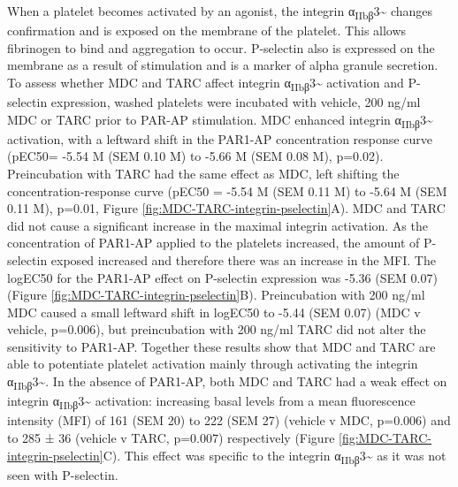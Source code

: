 \documentclass[11pt,twoside]{bristolthesis}
\begin{document}
When a platelet becomes activated by an agonist, the integrin α\textsubscript{IIbβ}3\textasciitilde{} changes confirmation and is exposed on the membrane of the platelet. This allows fibrinogen to bind and aggregation to occur. P-selectin also is expressed on the membrane as a result of stimulation and is a marker of alpha granule secretion. To assess whether MDC and TARC affect integrin α\textsubscript{IIbβ}3\textasciitilde{} activation and P-selectin expression, washed platelets were incubated with vehicle, 200 ng/ml MDC or TARC prior to PAR-AP stimulation. MDC enhanced integrin α\textsubscript{IIbβ}3\textasciitilde{} activation, with a leftward shift in the PAR1-AP concentration response curve (pEC50= -5.54 M (SEM 0.10 M) to -5.66 M (SEM 0.08 M), p=0.02). Preincubation with TARC had the same effect as MDC, left shifting the concentration-response curve (pEC50 = -5.54 M (SEM 0.11 M) to -5.64 M (SEM 0.11 M), p=0.01, Figure \ref{fig:MDC-TARC-integrin-pselectin}A). MDC and TARC did not cause a significant increase in the maximal integrin activation. As the concentration of PAR1-AP applied to the platelets increased, the amount of P-selectin exposed increased and therefore there was an increase in the MFI. The logEC50 for the PAR1-AP effect on P-selectin expression was -5.36 (SEM 0.07) (Figure \ref{fig:MDC-TARC-integrin-pselectin}B). Preincubation with 200 ng/ml MDC caused a small leftward shift in logEC50 to -5.44 (SEM 0.07) (MDC v vehicle, p=0.006), but preincubation with 200 ng/ml TARC did not alter the sensitivity to PAR1-AP. Together these results show that MDC and TARC are able to potentiate platelet activation mainly through activating the integrin α\textsubscript{IIbβ}3\textasciitilde. In the absence of PAR1-AP, both MDC and TARC had a weak effect on integrin α\textsubscript{IIbβ}3\textasciitilde{} activation: increasing basal levels from a mean fluorescence intensity (MFI) of 161 (SEM 20) to 222 (SEM 27) (vehicle v MDC, p=0.006) and to 285 ± 36 (vehicle v TARC, p=0.007) respectively (Figure \ref{fig:MDC-TARC-integrin-pselectin}C). This effect was specific to the integrin α\textsubscript{IIbβ}3\textasciitilde{} as it was not seen with P-selectin.
\end{document}
